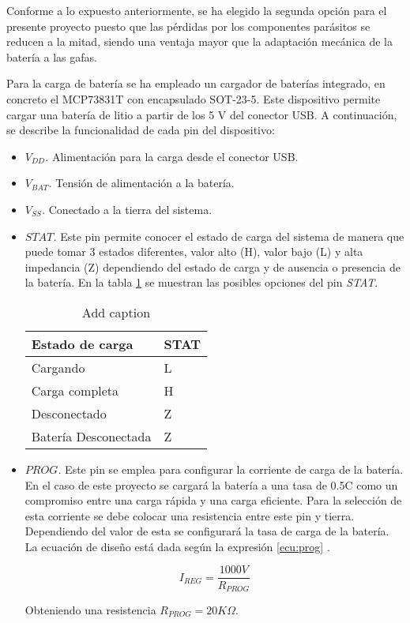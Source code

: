 Conforme a lo expuesto anteriormente, se ha elegido la segunda opción para el presente proyecto puesto que las pérdidas por los componentes parásitos se reducen a la mitad, siendo una ventaja mayor que la adaptación mecánica de la batería a las gafas.


Para la carga de batería se ha empleado un cargador de baterías integrado, en concreto el MCP73831T con encapsulado SOT-23-5. Este dispositivo permite cargar una batería de litio a partir de los 5 V del conector USB. A continuación, se describe la funcionalidad de cada pin del dispositivo:

\begin{itemize}
\item\textit{$V_{DD}$.} Alimentación para la carga desde el conector USB.
\item\textit{$V_{BAT}$.} Tensión de alimentación a la batería.
\item\textit{$V_{SS}$.} Conectado a la tierra del sistema.
\item\textit{$STAT$.} Este pin permite conocer el estado de carga del sistema de manera que puede tomar 3 estados diferentes, valor alto (H), valor bajo (L) y alta impedancia (Z) dependiendo del estado de carga y de ausencia o presencia de la batería. En la tabla \ref{tab:bat_STAT} se muestran las posibles opciones del pin \textit{STAT}.

\begin{table}[!ht]
  \centering
  
  \begin{tabular}{|l|l|}
    \hline
    \textbf{Estado de carga} & \textbf{STAT} \tabularnewline
    \hline
     Cargando& L \tabularnewline
    \hline
     Carga completa& H  \tabularnewline
    \hline
     Desconectado& Z \tabularnewline
    \hline
     Batería Desconectada& Z \tabularnewline
    \hline
    \end{tabular}%
    \caption{Add caption}
  \label{tab:bat_STAT}%
\end{table}%

\item\textit{$PROG$.} Este pin se emplea para configurar la corriente de carga de la batería. En el caso de este proyecto se cargará la batería a una tasa de 0.5C como un compromiso entre una carga rápida y una carga eficiente. Para la selección de esta corriente se debe colocar una resistencia entre este pin y tierra. Dependiendo del valor de esta se configurará la tasa de carga de la batería. La ecuación de diseño está dada según la expresión \ref{ecu:prog} \cite{mcp}.

\begin{equation}\label{ecu:prog}
I_{REG}=\frac{1000  V}{R_{PROG}}
\end{equation}

Obteniendo una resistencia $R_{PROG}=20 K\Omega$.

\end{itemize}

